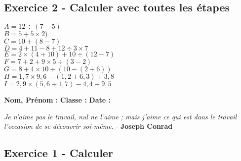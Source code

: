\documentclass[11pt]{article}
\begin{document}
\subsection*{Exercice 2 - Calculer avec toutes les étapes}

\begin{multicols}{3}
  \noindent
  $A = 12\div (7-5)$ \\
  $B = 5 + 5 \times 2)$ \\
  $C = 10+(8-7)$ \\
  $D = 4+11-8+12\div 3\times 7$ \\
  $E = 2\times (4+10)+10\div (12-7)$ \\
  $F = 7+2+9\times 5\div (3-2)$ \\
  $G = 8+4\times 10\div (10-(2+6))$ \\
  $H = 1{,}7\times 9{,}6-(1{,}2+6{,}3)+3{,}8$ \\
  $I = 2{,}9\times (5{,}6+1{,}7)-4{,}4+9{,}5$ 
  \end{multicols}

  \vspace{4cm}

\textbf{Nom, Prénom :} \hspace{8cm} \textbf{Classe :} \hspace{3cm} \textbf{Date :}\\
\vspace{-0.8cm}
\begin{center}
  \textit{Je n'aime pas le travail, nul ne l'aime ; mais j'aime ce qui est dans le travail l'occasion de se découvrir soi-même.}  - \textbf{Joseph Conrad}
\end{center}
\vspace{-0.8cm}

\subsection*{Exercice 1 - Calculer}
\end{document}
